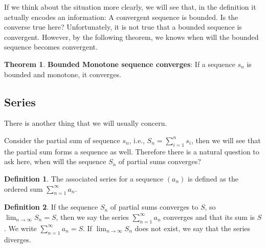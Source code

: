\documentclass[12pt]{article}
\theoremstyle{definition}
\newtheorem{thm}{Theorem}[section]
\theoremstyle{definition}
\newtheorem{definition}{Definition}[section]
\theoremstyle{remark}
\theoremstyle{definition}
\theoremstyle{definition}
\theoremstyle{definition}
\begin{document}
If we think about the situation more clearly, we will see that, in the definition it actually encodes an information: A convergent sequence is bounded. Is the converse true here? Unfortunately, it is not true that a bounded sequence is convergent. However, by the following theorem, we knows when will the bounded sequence becomes convergent.

\begin{thm}
\textbf{Bounded Monotone sequence converges}: If a sequence $s_n$ is bounded and monotone, it converges.
\end{thm}

\newpage
\subsection{Series}
There is another thing that we will usually concern.

Consider the partial sum of sequence $s_n$, i.e., $S_n=\sum_{i=1}^{n}s_i$, then we will see that the partial sum forms a sequence as well. Therefore there is a natural question to ask here, when will the sequence $S_n$ of partial sums converges?


\begin{definition}
The associated series for a sequence $(a_n)$ is defined as the ordered sum $\sum_{n=1}^{\infty}a_n$.
\end{definition}


\begin{definition}
If the sequence $S_n$ of partial sums converges to $S$, so $\lim_{n \to \infty}S_n = S$, then we say the series
$\sum_{n=1}^{\infty} a_n$ converges and that its sum is $S$. We write
$\sum_{n=1}^{\infty} a_n = S$. If $\lim_{n \to \infty}S_n$ does not exist, we
say that the series diverges.
\end{definition}
\end{document}
